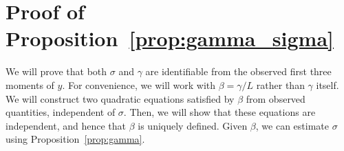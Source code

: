 \documentclass[english,11pt]{article}
\newcommand{\1}{\mathbf{1}}
\numberwithin{equation}{section}
\theoremstyle{plain}
\theoremstyle{definition}
\theoremstyle{remark}
\theoremstyle{plain}
\theoremstyle{remark}
\theoremstyle{plain}
\theoremstyle{plain}
\begin{document}

\section{Proof of Proposition~\ref{prop:gamma_sigma}} \label{sec:proof_prop_gamma_sigma}

We will prove that both $\sigma$ and $\gamma$ are identifiable from the observed first three moments of $y$. For convenience, we will work with $\beta = \gamma / L$ rather than $\gamma$ itself. We will construct two quadratic equations satisfied by $\beta$ from observed quantities, independent of $\sigma$. Then, we will show that these equations are independent, and hence that $\beta$ is uniquely defined.  Given $\beta$, we can estimate $\sigma$ using Proposition~\ref{prop:gamma}.
\end{document}
